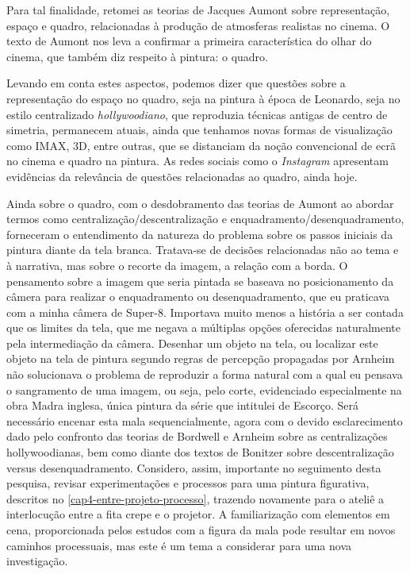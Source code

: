 Para tal finalidade, retomei as teorias de Jacques Aumont sobre
representação, espaço e quadro, relacionadas à produção de atmosferas
realistas no cinema. O texto de Aumont nos leva a confirmar a primeira
característica do olhar do cinema, que também diz respeito à pintura: o
quadro. 

Levando em conta estes aspectos, podemos dizer que questões
sobre a representação do espaço no quadro, seja na pintura à época de
Leonardo, seja no estilo centralizado \emph{hollywoodiano}, que reproduzia
técnicas antigas de centro de simetria, permanecem atuais, ainda que
tenhamos novas formas de visualização como IMAX, 3D, entre outras, que
se distanciam da noção convencional de ecrã no cinema e quadro na
pintura. As redes sociais como o \emph{Instagram} apresentam evidências da
relevância de questões relacionadas ao quadro, ainda hoje.

Ainda sobre o quadro, com o desdobramento das teorias de Aumont ao
abordar termos como centralização\slash descentralização e
enquadramento/desenquadramento, forneceram o entendimento da natureza
do problema sobre os passos iniciais da pintura diante da tela branca.
Tratava-se de decisões relacionadas não ao tema e à narrativa, mas
sobre o recorte da imagem, a relação com a borda. O pensamento sobre a
imagem que seria pintada se baseava no posicionamento da câmera para
realizar o enquadramento ou desenquadramento, que eu praticava com a
minha câmera de Super-8. Importava muito menos a história a ser contada
que os limites da tela, que me negava a múltiplas opções oferecidas
naturalmente pela intermediação da câmera. Desenhar um objeto na tela,
ou localizar este objeto na tela de pintura segundo regras de percepção
propagadas por Arnheim não solucionava o problema de reproduzir a forma
natural com a qual eu pensava o sangramento de uma imagem, ou seja,
pelo corte, evidenciado especialmente na obra Madra inglesa, única
pintura da série que intitulei de Escorço. Será necessário encenar esta
mala sequencialmente, agora com o devido esclarecimento dado pelo
confronto das teorias de Bordwell e Arnheim sobre as centralizações
hollywoodianas, bem como diante dos textos de Bonitzer sobre
descentralização versus desenquadramento. Considero, assim, importante
no seguimento desta pesquisa, revisar experimentações e processos para
uma pintura figurativa, descritos no \cref{cap4-entre-projeto-processo}, trazendo novamente
para o ateliê a interlocução entre a fita crepe e o projetor. A
familiarização com elementos em cena, proporcionada pelos estudos com a
figura da mala pode resultar em novos caminhos processuais, mas este é
um tema a considerar para uma nova investigação.


